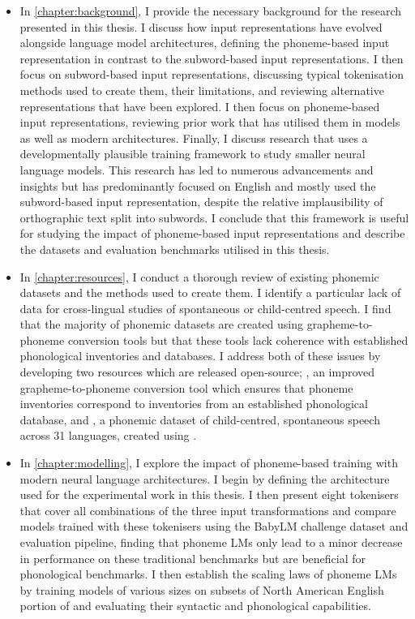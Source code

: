 \begin{itemize}
    \item In \cref{chapter:background}, I provide the necessary background for the research presented in this thesis. I discuss how input representations have evolved alongside language model architectures, defining the phoneme-based input representation in contrast to the subword-based input representations. I then focus on subword-based input representations, discussing typical tokenisation methods used to create them, their limitations, and reviewing alternative representations that have been explored. I then focus on phoneme-based input representations, reviewing prior work that has utilised them in \ngram models as well as modern architectures. Finally, I discuss research that uses a developmentally plausible training framework to study smaller neural language models. This research has led to numerous advancements and insights but has predominantly focused on English and mostly used the subword-based input representation, despite the relative implausibility of orthographic text split into subwords. I conclude that this framework is useful for studying the impact of phoneme-based input representations and describe the datasets and evaluation benchmarks utilised in this thesis.
    \item In \cref{chapter:resources}, I conduct a thorough review of existing phonemic datasets and the methods used to create them. I identify a particular lack of data for cross-lingual studies of spontaneous or child-centred speech. I find that the majority of phonemic datasets are created using grapheme-to-phoneme conversion tools but that these tools lack coherence with established phonological inventories and databases. I address both of these issues by developing two resources which are released open-source; \gpp, an improved grapheme-to-phoneme conversion tool which ensures that phoneme inventories correspond to inventories from an established phonological database, and \ipachildes, a phonemic dataset of child-centred, spontaneous speech across 31 languages, created using \gpp.
    \item In \cref{chapter:modelling}, I explore the impact of phoneme-based training with modern neural language architectures. I begin by defining the architecture used for the experimental work in this thesis. I then present eight tokenisers that cover all combinations of the three input transformations and compare models trained with these tokenisers using the BabyLM challenge dataset and evaluation pipeline, finding that phoneme LMs only lead to a minor decrease in performance on these traditional benchmarks but are beneficial for phonological benchmarks. I then establish the scaling laws of phoneme LMs by training models of various sizes on subsets of North American English portion of \ipachildes and evaluating their syntactic and phonological capabilities.

\end{itemize}
